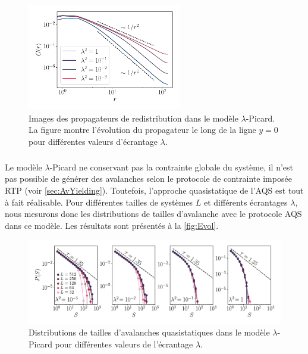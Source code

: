 \begin{figure}[h]
	\centering
	\includegraphics[width=0.6\textwidth]{Chapitre6/Figures/ScreenedPropagators.pdf}
	\caption{Images des propagateurs de redistribution dans le modèle $\lambda$-Picard. La figure montre l'évolution du propagateur le long de la ligne $y=0$ pour différentes valeurs d'écrantage $\lambda$.}
	\label{fig:screenedprop}
\end{figure}

\subparagraph{}Le modèle $\lambda$-Picard ne conservant pas la contrainte globale du système, il n'est pas possible de générer des avalanches selon le protocole de contrainte imposée RTP (voir \autoref{sec:AvYielding}). Toutefois, l'approche quasistatique de l'AQS est tout à fait réalisable. Pour différentes tailles de systèmes $L$ et différents écrantages $\lambda$, nous mesurons donc les distributions de tailles d'avalanche avec le protocole AQS dans ce modèle. Les résultats sont présentés à la \autoref{fig:Evol}.

\begin{figure}[h]
	\centering
	\includegraphics[width=\textwidth]{Chapitre4/Figures/Avalanches/EvolLambdaAv.pdf}
	
	\caption{Distributions de tailles d'avalanches quasistatiques dans le modèle $\lambda$-Picard pour différentes valeurs de l'écrantage $\lambda$.}
	\label{fig:Evol}
\end{figure}

